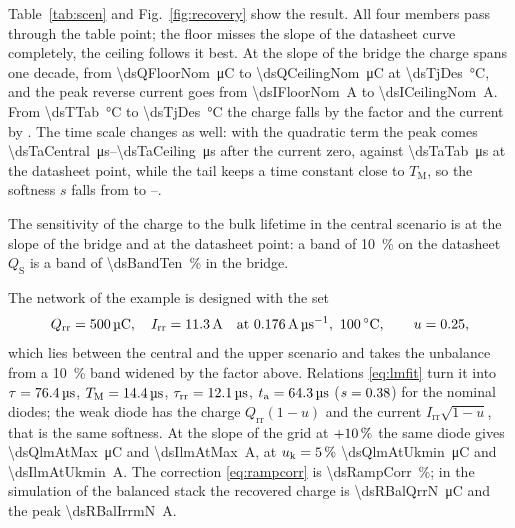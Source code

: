 \documentclass[10pt,a4paper]{scrartcl}
\newcommand{\Qrr}{Q_\mathrm{rr}}
\newcommand{\Irr}{I_\mathrm{rr}}
\newcommand{\ta}{t_\mathrm{a}}
\newcommand{\trr}{\tau_\mathrm{rr}}
\newcommand{\TM}{T_\mathrm{M}}
\newcommand{\uk}{u_\mathrm{k}}
\begin{document}
Table~\ref{tab:scen} and Fig.~\ref{fig:recovery} show the result. All four members pass through the table point; the floor misses the slope of the datasheet curve completely, the ceiling follows it best. At the slope of the bridge the charge spans one decade, from \SI{\dsQFloorNom}{\micro\coulomb} to \SI{\dsQCeilingNom}{\micro\coulomb} at \SI{\dsTjDes}{\celsius}, and the peak reverse current goes from \SI{\dsIFloorNom}{\ampere} to \SI{\dsICeilingNom}{\ampere}. From \SI{\dsTTab}{\celsius} to \SI{\dsTjDes}{\celsius} the charge falls by the factor \dsFacQ{} and the current by \dsFacI{}. The time scale changes as well: with the quadratic term the peak comes \SIrange{\dsTaCentral}{\dsTaCeiling}{\micro\second} after the current zero, against \SI{\dsTaTab}{\micro\second} at the datasheet point, while the tail keeps a time constant close to $\TM$, so the softness $s$ falls from \dsSoftTab{} to \dsSoftCeiling{}--\dsSoftCentral{}.

The sensitivity of the charge to the bulk lifetime in the central scenario is \dsSensWp{} at the slope of the bridge and \dsSensDs{} at the datasheet point: a band of \SI{10}{\percent} on the datasheet $Q_\mathrm{S}$ is a band of \SI{\dsBandTen}{\percent} in the bridge.

The network of the example is designed with the set
\begin{equation*}
\Qrr = \SI{\dsQdes}{\micro\coulomb}, \quad \Irr = \SI{\dsIdes}{\ampere} \quad \text{at}\ \SI{\dsAref}{\ampere\per\micro\second},\ \SI{\dsTjDes}{\celsius}, \qquad u = \dsUunb ,
\end{equation*}
which lies between the central and the upper scenario and takes the unbalance from a \SI{10}{\percent} band widened by the factor above. Relations \eqref{eq:lmfit} turn it into $\tau = \SI{76.4}{\micro\second}$, $\TM = \SI{\dsLmTm}{\micro\second}$, $\trr = \SI{\dsLmTt}{\micro\second}$, $\ta = \SI{\dsLmTa}{\micro\second}$ ($s = 0.38$) for the nominal diodes; the weak diode has the charge $\Qrr(1-u)$ and the current $\Irr\sqrt{1-u}$, that is the same softness. At the slope of the grid at $+10\,\%$ the same diode gives \SI{\dsQlmAtMax}{\micro\coulomb} and \SI{\dsIlmAtMax}{\ampere}, at $\uk = \dsUkMin\,\%$ \SI{\dsQlmAtUkmin}{\micro\coulomb} and \SI{\dsIlmAtUkmin}{\ampere}. The correction \eqref{eq:rampcorr} is \SI{\dsRampCorr}{\percent}; in the simulation of the balanced stack the recovered charge is \SI{\dsRBalQrrN}{\micro\coulomb} and the peak \SI{\dsRBalIrrmN}{\ampere}.

\end{document}
